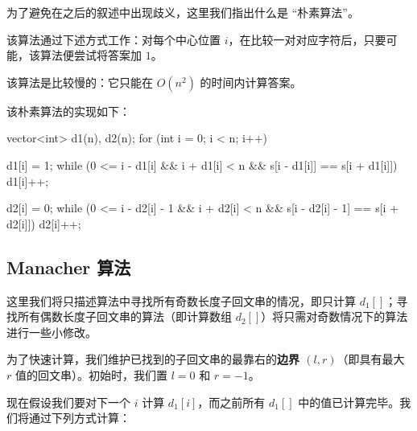 为了避免在之后的叙述中出现歧义，这里我们指出什么是 “朴素算法”。

该算法通过下述方式工作：对每个中心位置 $i$，在比较一对对应字符后，只要可能，该算法便尝试将答案加 $1$。

该算法是比较慢的：它只能在 $O(n^2)$ 的时间内计算答案。

该朴素算法的实现如下：

\begin{cppcode}
vector<int> d1(n), d2(n);
for (int i = 0; i < n; i++) {
  d1[i] = 1;
  while (0 <= i - d1[i] && i + d1[i] < n && s[i - d1[i]] == s[i + d1[i]]) {
    d1[i]++;
  }

  d2[i] = 0;
  while (0 <= i - d2[i] - 1 && i + d2[i] < n &&
         s[i - d2[i] - 1] == s[i + d2[i]]) {
    d2[i]++;
  }
}
\end{cppcode}

\subsection{Manacher 算法}

这里我们将只描述算法中寻找所有奇数长度子回文串的情况，即只计算 $d_1[]$；寻找所有偶数长度子回文串的算法（即计算数组 $d_2[]$）将只需对奇数情况下的算法进行一些小修改。

为了快速计算，我们维护已找到的子回文串的最靠右的\textbf{边界 $(l, r)$}（即具有最大 $r$ 值的回文串）。初始时，我们置 $l = 0$ 和 $r = -1$。

现在假设我们要对下一个 $i$ 计算 $d_1[i]$，而之前所有 $d_1[]$ 中的值已计算完毕。我们将通过下列方式计算：

